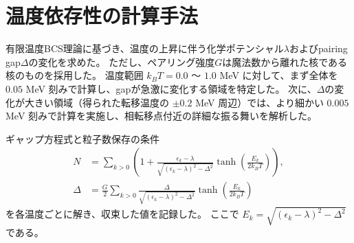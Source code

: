 \documentclass[a4paper,11pt]{jsreport}
\begin{document}
  \section{温度依存性の計算手法}
  有限温度BCS理論に基づき、温度の上昇に伴う化学ポテンシャル\(\lambda\)およびpairing gap\(\Delta\)の変化を求めた。
  ただし、ペアリング強度\(G\)は魔法数から離れた核である核のものを採用した。 
  温度範囲 \(k_B T = 0.0\) 〜 \(1.0\) MeV に対して、まず全体を \(0.05\) MeV 刻みで計算し、gapが急激に変化する領域を特定した。  
  次に、\(\Delta\)の変化が大きい領域（得られた転移温度の \(\pm 0.2\) MeV 周辺）では、より細かい \(0.005\) MeV 刻みで計算を実施し、相転移点付近の詳細な振る舞いを解析した。  

  ギャップ方程式と粒子数保存の条件  
  \begin{align}
      N &= \sum_{k>0} \left( 1 + \frac{\epsilon_k - \lambda}{\sqrt{(\epsilon_k - \lambda)^2 - \Delta^2}} \tanh \left(\frac{E_k}{2k_B T} \right) \right), \\
      \Delta &= \frac{G}{2} \sum_{k>0} \frac{\Delta}{\sqrt{(\epsilon_k - \lambda)^2 - \Delta^2}} \tanh \left(\frac{E_k}{2k_B T} \right)
  \end{align}
  を各温度ごとに解き、収束した値を記録した。  
  ここで \(E_k = \sqrt{(\epsilon_k - \lambda)^2 - \Delta^2}\) である。  
\end{document}
